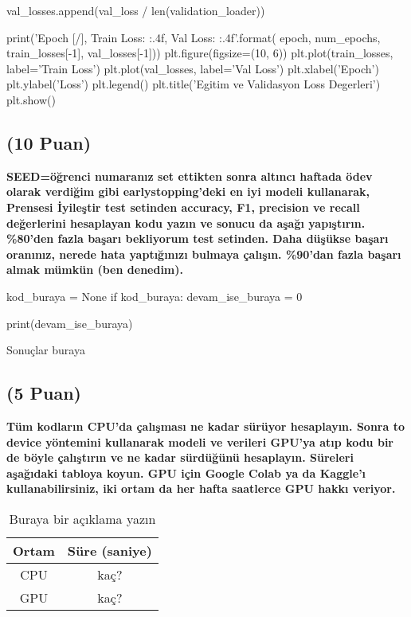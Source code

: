 \documentclass[11pt]{article}
\begin{document}
\begin{python}
    val_losses.append(val_loss / len(validation_loader))
    
    print('Epoch [{}/{}], Train Loss: {:.4f}, Val Loss: {:.4f}'.format(
        epoch, num_epochs, train_losses[-1], val_losses[-1]))
plt.figure(figsize=(10, 6))
plt.plot(train_losses, label='Train Loss')
plt.plot(val_losses, label='Val Loss')
plt.xlabel('Epoch')
plt.ylabel('Loss')
plt.legend()
plt.title('Egitim ve Validasyon Loss Degerleri')
plt.show()
\end{python}

\begin{comment}
\begin{figure}[ht!]
    \centering
    \texttt{[image: mypicturehere.png]}
    \caption{Buraya açıklama yazın}
    \label{fig:my_pic}
\end{figure}
\end{comment}

\subsection{(10 Puan)} \textbf{SEED=öğrenci numaranız set ettikten sonra altıncı haftada ödev olarak verdiğim gibi earlystopping'deki en iyi modeli kullanarak, Prensesi İyileştir test setinden accuracy, F1, precision ve recall değerlerini hesaplayan kodu yazın ve sonucu da aşağı yapıştırın. \%80'den fazla başarı bekliyorum test setinden. Daha düşükse başarı oranınız, nerede hata yaptığınızı bulmaya çalışın. \%90'dan fazla başarı almak mümkün (ben denedim).}

\begin{python}
kod_buraya = None
if kod_buraya:
    devam_ise_buraya = 0

print(devam_ise_buraya)
\end{python}

Sonuçlar buraya

\subsection{(5 Puan)} \textbf{Tüm kodların CPU'da çalışması ne kadar sürüyor hesaplayın. Sonra to device yöntemini kullanarak modeli ve verileri GPU'ya atıp kodu bir de böyle çalıştırın ve ne kadar sürdüğünü hesaplayın. Süreleri aşağıdaki tabloya koyun. GPU için Google Colab ya da Kaggle'ı kullanabilirsiniz, iki ortam da her hafta saatlerce GPU hakkı veriyor.}

\begin{table}[ht!]
    \centering
    \caption{Buraya bir açıklama yazın}
    \begin{tabular}{c|c}
        Ortam & Süre (saniye) \\\hline
        CPU & kaç? \\
        GPU & kaç?\\
    \end{tabular}
    \label{tab:my_table}
\end{table}
\end{document}
